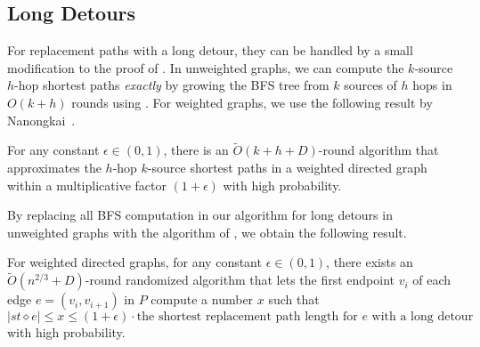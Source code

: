 

\subsection{Long Detours}

For replacement paths with a long detour, they can be handled  by a small modification to the proof of .
In unweighted graphs, we can compute the $k$-source $h$-hop shortest paths \emph{exactly} by growing the BFS tree from $k$ sources of $h$ hops in $O(k+h)$ rounds using . For weighted graphs, we use the following result by Nanongkai~\cite[Theorem 3.6]{nanongkai2014distributed}. 

\begin{lemma}\label{nanongkai2014distributed}
    For any constant $\epsilon \in (0,1)$, there is an $\widetilde{O}(k+h+D)$-round algorithm that approximates the $h$-hop $k$-source shortest paths in a weighted directed graph within a multiplicative factor $(1+\epsilon)$ with high probability.
\end{lemma}

By replacing all BFS computation in our algorithm for long detours in unweighted graphs with the algorithm of , we obtain the following result.

\begin{proposition}\label{approxsssp}
    For weighted directed graphs, for any constant $\epsilon \in (0,1)$, there exists an $\widetilde{O}(n^{2/3}+D)$-round randomized algorithm that lets the first endpoint $v_i$ of each edge $e=(v_i, v_{i+1})$ in $P$ compute a number $x$ such that
    \[|st \diamond e| \leq x \leq (1+\epsilon) \cdot \text{the shortest replacement path length for $e$ with a long detour}\] with high probability.   
\end{proposition}


